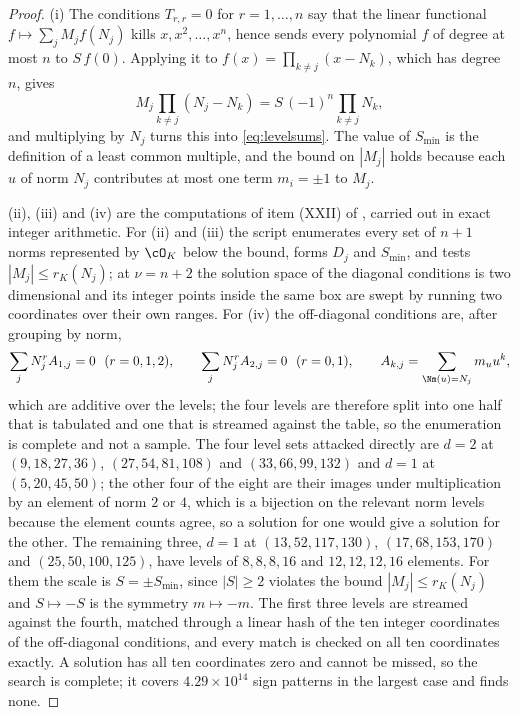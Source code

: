 \begin{proof}
(i) The conditions $T_{r,r}=0$ for $r=1,\dots,n$ say that the linear
functional $f\mapsto\sum_{j}M_{j}f(N_{j})$ kills $x,x^{2},\dots,x^{n}$, hence
sends every polynomial $f$ of degree at most $n$ to $S\,f(0)$. Applying it to
$f(x)=\prod_{k\ne j}(x-N_{k})$, which has degree $n$, gives
\[
  M_{j}\prod_{k\ne j}(N_{j}-N_{k})=S\,(-1)^{n}\prod_{k\ne j}N_{k},
\]
and multiplying by $N_{j}$ turns this into \eqref{eq:levelsums}. The value of
$S_{\min}$ is the definition of a least common multiple, and the bound on
$|M_{j}|$ holds because each $u$ of norm $N_{j}$ contributes at most one term
$m_{i}=\pm1$ to $M_{j}$.

(ii), (iii) and (iv) are the computations of item (XXII) of
, carried out in exact integer arithmetic. For (ii) and
(iii) the script enumerates every set of $n+1$ norms represented by $\cO_{K}$
below the bound, forms $D_{j}$ and $S_{\min}$, and tests
$|M_{j}|\le r_{K}(N_{j})$; at $\nu=n+2$ the solution space of the diagonal
conditions is two dimensional and its integer points inside the same box are
swept by running two coordinates over their own ranges. For (iv) the
off-diagonal conditions are, after grouping by norm,
\[
  \sum_{j}N_{j}^{r}A_{1,j}=0\ \ (r=0,1,2),
  \qquad
  \sum_{j}N_{j}^{r}A_{2,j}=0\ \ (r=0,1),
  \qquad
  A_{k,j}=\sum_{\Nm(u)=N_{j}}m_{u}u^{k},
\]
which are additive over the levels; the four levels are therefore split into
one half that is tabulated and one that is streamed against the table, so the
enumeration is complete and not a sample. The four level sets attacked
directly are $d=2$ at $(9,18,27,36)$, $(27,54,81,108)$ and $(33,66,99,132)$
and $d=1$ at $(5,20,45,50)$; the other four of the eight are their images
under multiplication by an element of norm $2$ or $4$, which is a bijection on
the relevant norm levels because the element counts agree, so a solution for
one would give a solution for the other. The remaining three, $d=1$ at
$(13,52,117,130)$, $(17,68,153,170)$ and $(25,50,100,125)$, have levels of
$8,8,8,16$ and $12,12,12,16$ elements. For them the scale is $S=\pm S_{\min}$,
since $|S|\ge2$ violates the bound $|M_{j}|\le r_{K}(N_{j})$ and $S\mapsto-S$
is the symmetry $m\mapsto-m$. The first three levels are streamed against the
fourth, matched through a linear hash of the ten integer coordinates of the
off-diagonal conditions, and every match is checked on all ten coordinates
exactly. A solution has all ten coordinates zero and cannot be missed, so the
search is complete; it covers $4.29\times10^{14}$ sign patterns in the
largest case and finds none.
\end{proof}

